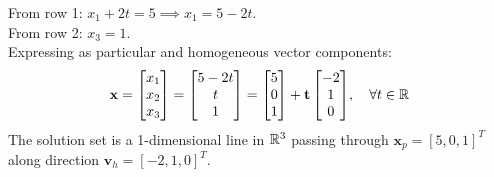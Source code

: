 \begin{enumerate}
    From row 1: $x_1 + 2t = 5 \implies x_1 = 5 - 2t$. \\
    From row 2: $x_3 = 1$. \\
    Expressing as particular and homogeneous vector components:
    \begin{equation*}
    \mathbf{x} = \begin{bmatrix} x_1 \\ x_2 \\ x_3 \end{bmatrix} = \begin{bmatrix} 5 - 2t \\ t \\ 1 \end{bmatrix} = \mathbf{\begin{bmatrix} 5 \\ 0 \\ 1 \end{bmatrix} + t \begin{bmatrix} -2 \\ 1 \\ 0 \end{bmatrix}}, \quad \forall t \in \mathbb{R}
    \end{equation*}
    The solution set is a 1-dimensional line in $\mathbb{R}^3$ passing through $\mathbf{x}_p = [5, 0, 1]^T$ along direction $\mathbf{v}_h = [-2, 1, 0]^T$.
\end{enumerate}

